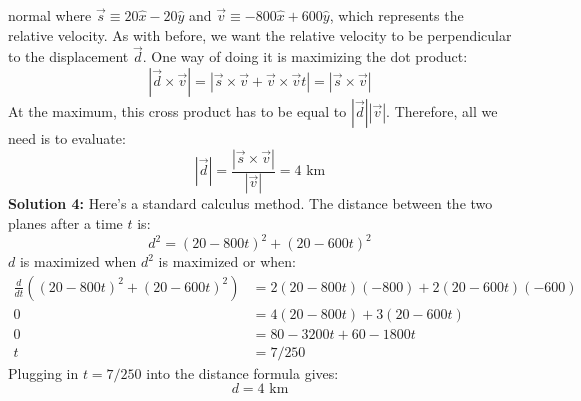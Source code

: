 \begin{solution}{normal}
where $\vec{s} \equiv 20\hat{x}-20\hat{y}$ and $\vec{v}\equiv -800\hat{x}+600\hat{y}$, which represents the relative velocity. As with before, we want the relative velocity to be perpendicular to the displacement $\vec{d}$. One way of doing it is maximizing the dot product:
$$|\vec{d} \times \vec{v}| = |\vec{s}\times\vec{v} + \vec{v}\times\vec{v}t| = |\vec{s}\times\vec{v}|$$
At the maximum, this cross product has to be equal to $|\vec{d}||\vec{v}|$. Therefore, all we need is to evaluate:
$$|\vec{d}| = \frac{|\vec{s}\times\vec{v}|}{|\vec{v}|} = \boxed{4 \text{ km}}$$
\tcbline
\textbf{Solution 4:}
Here's a standard calculus method. The distance between the two planes after a time $t$ is:
$$d^2 = (20-800t)^2+(20-600t)^2$$
$d$ is maximized when $d^2$ is maximized or when:
\begin{align*}
\frac{d}{dt} \left((20-800t)^2+(20-600t)^2\right) &= 2(20-800t)(-800)+2(20-600t)(-600)\\
0 &= 4(20-800t)+3(20-600t) \\
0 &= 80-3200t+60-1800t \\
t &= 7/250
\end{align*}
Plugging in $t=7/250$ into the distance formula gives:
$$d=\boxed{4 \text{ km}}$$
\end{solution}
